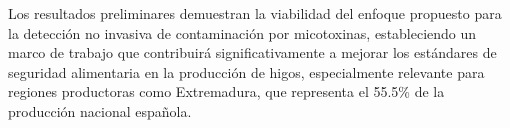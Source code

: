 \vspace{5mm}

Los resultados preliminares demuestran la viabilidad del enfoque propuesto para la detección no invasiva de contaminación por micotoxinas, estableciendo un marco de trabajo que contribuirá significativamente a mejorar los estándares de seguridad alimentaria en la producción de higos, especialmente relevante para regiones productoras como Extremadura, que representa el 55.5\% de la producción nacional española.

\vspace{5mm}

